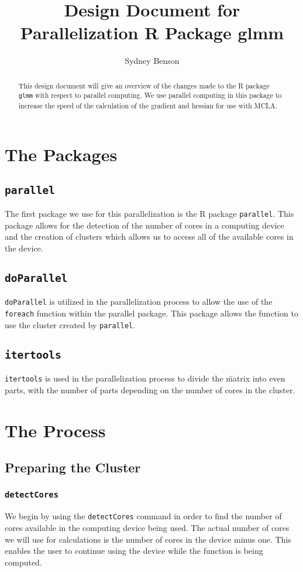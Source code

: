 \documentclass{article}
\title{Design Document for Parallelization R Package glmm}
\author{Sydney Benson}
\begin{document}
\maketitle{}

\begin{abstract}
This design document will give an overview of the changes made to the R package \texttt{glmm} with respect to parallel computing. We use parallel computing in this package to increase the speed of the calculation of the gradient and hessian for use with MCLA. 
\end{abstract}

\section{The Packages}
\subsection{\texttt{parallel}}
The first package we use for this parallelization is the R package \texttt{parallel}. This package allows for the detection of the number of cores in a computing device and the creation of clusters which allows us to access all of the available cores in the device.

\subsection{\texttt{doParallel}}
\texttt{doParallel} is utilized in the parallelization process to allow the use of the \texttt{foreach} function within the parallel package. This package allows the function to use the cluster created by \texttt{parallel}. 

\subsection{\texttt{itertools}}
\texttt{itertools} is used in the parallelization process to divide the \u matrix into even parts, with the number of parts depending on the number of cores in the cluster. 

\section{The Process}
\subsection{Preparing the Cluster}
\subsubsection{\texttt{detectCores}}
We begin by using the \texttt{detectCores} command in order to find the number of cores available in the computing device being used. The actual number of cores we will use for calculations is the number of cores in the device minus one. This enables the user to continue using the device while the function is being computed. 
\end{document}
